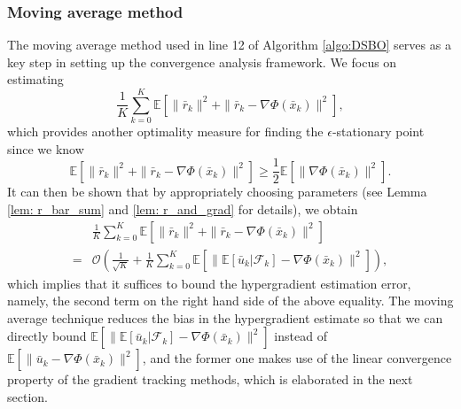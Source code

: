 \documentclass{article}
\theoremstyle{plain}
\theoremstyle{definition}
\theoremstyle{remark}
\newcommand{\E}{\mathbb{E}}
\newcommand{\F}{\mathcal{F}}
\newcommand{\cO}{\mathcal{O}}
\begin{document}
\subsubsection{Moving average method}\label{sec: MA}
The moving average method used in line 12 of Algorithm \ref{algo:DSBO} serves as a key step in setting up the convergence analysis framework. We focus on estimating
\[
    \frac{1}{K}\sum_{k=0}^{K}\E\left[\|\bar{r}_k\|^2 + \|\bar{r}_k - \nabla\Phi(\bar{x}_k)\|^2\right],
\]
which provides another optimality measure for finding the $\epsilon$-stationary point since we know
\[
    \E\left[\|\bar{r}_k\|^2 + \|\bar{r}_k - \nabla\Phi(\bar{x}_k)\|^2\right]\geq \frac{1}{2}\E\left[\|\nabla\Phi(\bar{x}_k)\|^2\right].
\]
It can then be shown that by appropriately choosing parameters (see Lemma \ref{lem: r_bar_sum} and \ref{lem: r_and_grad} for details), we obtain
\begin{align*}
    &\frac{1}{K}\sum_{k=0}^{K}\E\left[\|\bar{r}_k\|^2 + \|\bar{r}_k - \nabla\Phi(\bar{x}_k)\|^2\right] \\
    = &\cO\left(\frac{1}{\sqrt{K}} + \frac{1}{K}\sum_{k=0}^{K}\E\left[\|\E\left[\bar{u}_k|\F_k\right] - \nabla\Phi(\bar{x}_k)\|^2\right]\right),
\end{align*}
which implies that it suffices to bound the hypergradient estimation error, namely, the second term on the right hand side of the above equality. The moving average technique reduces the bias in the hypergradient estimate so that we can directly bound $\E\left[\|\E\left[\bar{u}_k|\F_k\right] - \nabla\Phi(\bar{x}_k)\|^2\right]$ instead of $\E\left[\|\bar{u}_k - \nabla\Phi(\bar{x}_k)\|^2\right]$, and the former one makes use of the linear convergence property of the gradient tracking methods, which is elaborated in the next section.
\end{document}
